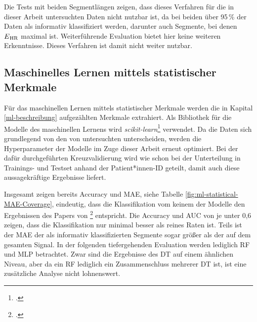 Die Tests mit beiden Segmentlängen zeigen, dass dieses Verfahren für die in dieser Arbeit untersuchten Daten nicht nutzbar ist, da bei beiden über 95\,\% der Daten als informativ klassifiziert werden, darunter auch Segmente, bei denen $E\textsubscript{HR}$ maximal ist. Weiterführende Evaluation bietet hier keine weiteren Erkenntnisse. Dieses Verfahren ist damit nicht weiter nutzbar.

\subsection{Maschinelles Lernen mittels statistischer Merkmale}\label{res-statistical}

Für das maschinellen Lernen mittels statistischer Merkmale werden die in Kapital \ref{ml-beschreibung} aufgezählten Merkmale extrahiert. Als Bibliothek für die Modelle des maschinellen Lernens wird \textit{scikit-learn}\footcite[]{scikit-learn} verwendet. Da die Daten sich grundlegend von den von \citeauthor{Sadek2016} untersuchten unterscheiden, werden die Hyperparameter der Modelle im Zuge dieser Arbeit erneut optimiert. Bei der dafür durchgeführten Kreuzvalidierung wird wie schon bei der Unterteilung in Trainings- und Testset anhand der Patient*innen-ID geteilt, damit auch diese aussagekräftige Ergebnisse liefert.

Insgesamt zeigen bereits Accuracy und \ac{MAE}, siehe Tabelle \ref{fig:ml-statistical-MAE-Coverage}, eindeutig, dass die Klassifikation vom keinem der Modelle den Ergebnissen des Papers von \citeauthor{Sadek2016}\footcite{Sadek2016} entspricht. Die Accuracy und AUC von je unter 0,6 zeigen, dass die Klassifikation nur minimal besser als reines Raten ist. Teils ist der \ac{MAE} der als informativ klassifizierten Segmente sogar größer als der auf dem gesamten Signal. In der folgenden tiefergehenden Evaluation werden lediglich \ac{RF} und \ac{MLP} betrachtet. Zwar sind die Ergebnisse des \ac{DT} auf einem ähnlichen Niveau, aber da ein \ac{RF} lediglich ein Zusammenschluss mehrerer \ac{DT} ist, ist eine zusätzliche Analyse nicht lohnenswert. 

